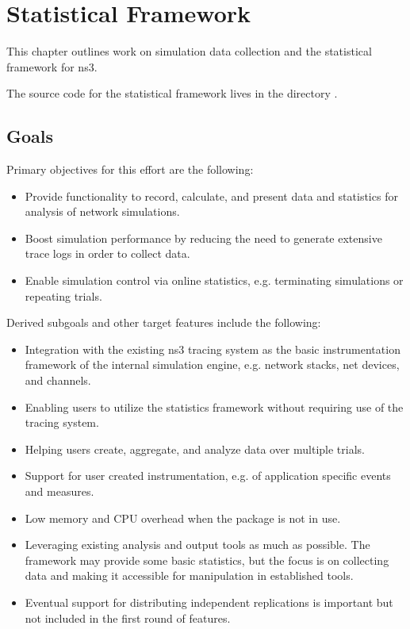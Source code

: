 \documentclass[letterpaper,10pt,english]{sphinxmanual}
\renewcommand{\sphinxcode}[1]{\texttt{\small{#1}}}
\begin{document}
\chapter{Statistical Framework}
\label{\detokenize{statistics:statistical-framework}}\label{\detokenize{statistics::doc}}
This chapter outlines work on simulation data collection and the
statistical framework for ns\sphinxhyphen{}3.

The source code for the statistical framework lives in the directory
\sphinxcode{}.


\section{Goals}
\label{\detokenize{statistics:goals}}
Primary objectives for this effort are the following:
\begin{itemize}
\item {} 
Provide functionality to record, calculate, and present data and statistics for analysis of network simulations.

\item {} 
Boost simulation performance by reducing the need to generate extensive trace logs in order to collect data.

\item {} 
Enable simulation control via online statistics, e.g. terminating simulations or repeating trials.

\end{itemize}

Derived sub\sphinxhyphen{}goals and other target features include the following:
\begin{itemize}
\item {} 
Integration with the existing ns\sphinxhyphen{}3 tracing system as the basic instrumentation framework of the internal simulation engine, e.g. network stacks, net devices, and channels.

\item {} 
Enabling users to utilize the statistics framework without requiring use of the tracing system.

\item {} 
Helping users create, aggregate, and analyze data over multiple trials.

\item {} 
Support for user created instrumentation, e.g. of application specific events and measures.

\item {} 
Low memory and CPU overhead when the package is not in use.

\item {} 
Leveraging existing analysis and output tools as much as possible.  The framework may provide some basic statistics, but the focus is on collecting data and making it accessible for manipulation in established tools.

\item {} 
Eventual support for distributing independent replications is important but not included in the first round of features.

\end{itemize}
\end{document}
